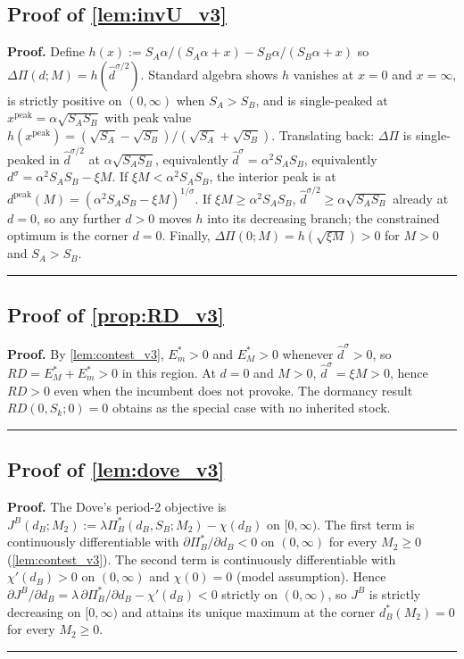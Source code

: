\documentclass[11pt,twoside]{extarticle}
\newenvironment{proof}[1][Proof]{\noindent \textbf{#1.} }{\ \rule{0.5em}{0.5em}}
\begin{document}
\subsection*{Proof of \autoref{lem:invU_v3}} \label{app:proof:invU_v3}
\begin{proof}
Define $h(x):=S_A\alpha/(S_A\alpha+x)-S_B\alpha/(S_B\alpha+x)$ so $\Delta\Pi(d;M)=h(\hat d^{\sigma/2})$. Standard algebra shows $h$ vanishes at $x=0$ and $x=\infty$, is strictly positive on $(0,\infty)$ when $S_A>S_B$, and is single-peaked at $x^{\mathrm{peak}}=\alpha\sqrt{S_A S_B}$ with peak value $h(x^{\mathrm{peak}})=(\sqrt{S_A}-\sqrt{S_B})/(\sqrt{S_A}+\sqrt{S_B})$. Translating back: $\Delta\Pi$ is single-peaked in $\hat d^{\sigma/2}$ at $\alpha\sqrt{S_A S_B}$, equivalently $\hat d^\sigma=\alpha^2 S_A S_B$, equivalently $d^\sigma=\alpha^2 S_A S_B-\xi M$. If $\xi M<\alpha^2 S_A S_B$, the interior peak is at $d^{\mathrm{peak}}(M)=(\alpha^2 S_A S_B-\xi M)^{1/\sigma}$. If $\xi M\ge\alpha^2 S_A S_B$, $\hat d^{\sigma/2}\ge\alpha\sqrt{S_A S_B}$ already at $d=0$, so any further $d>0$ moves $h$ into its decreasing branch; the constrained optimum is the corner $d=0$. Finally, $\Delta\Pi(0;M)=h(\sqrt{\xi M})>0$ for $M>0$ and $S_A>S_B$.
\end{proof}

\subsection*{Proof of \autoref{prop:RD_v3}} \label{app:proof:RD_v3}
\begin{proof}
By \autoref{lem:contest_v3}, $E_m^*>0$ and $E_M^*>0$ whenever $\hat d^\sigma>0$, so $RD=E_M^*+E_m^*>0$ in this region. At $d=0$ and $M>0$, $\hat d^\sigma=\xi M>0$, hence $RD>0$ even when the incumbent does not provoke. The dormancy result $RD(0,S_k;0)=0$ obtains as the special case with no inherited stock.
\end{proof}

\subsection*{Proof of \autoref{lem:dove_v3}} \label{app:proof:dove_v3}
\begin{proof}
The Dove's period-2 objective is $J^B(d_B;M_2):=\lambda\Pi_B^*(d_B,S_B;M_2)-\chi(d_B)$ on $[0,\infty)$. The first term is continuously differentiable with $\partial\Pi_B^*/\partial d_B<0$ on $(0,\infty)$ for every $M_2\ge 0$ (\autoref{lem:contest_v3}). The second term is continuously differentiable with $\chi'(d_B)>0$ on $(0,\infty)$ and $\chi(0)=0$ (model assumption). Hence $\partial J^B/\partial d_B=\lambda\,\partial\Pi_B^*/\partial d_B-\chi'(d_B)<0$ strictly on $(0,\infty)$, so $J^B$ is strictly decreasing on $[0,\infty)$ and attains its unique maximum at the corner $d_B^*(M_2)=0$ for every $M_2\ge 0$.
\end{proof}
\end{document}
